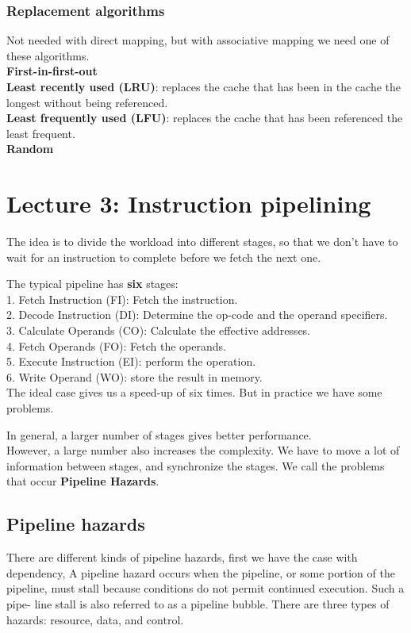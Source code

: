 \documentclass[titlepage, a4paper]{article}
\begin{document}
\subsubsection{Replacement algorithms}
Not needed with direct mapping, but with associative mapping we need one of these algorithms. \\

\textbf{First-in-first-out} \\
\textbf{Least recently used (LRU)}: replaces the cache that has been in the cache the longest without being referenced.\\
\textbf{Least frequently used (LFU)}: replaces the cache that has been referenced the least frequent.\\ 
\textbf{Random}\\ 

\section{Lecture 3: Instruction pipelining}
The idea is to divide the workload into different stages, so that we don't have to wait for an instruction to complete before we fetch the next one.

The typical pipeline has \textbf{six} stages: \\
1. Fetch Instruction (FI): Fetch the instruction.\\
2. Decode Instruction (DI): Determine the op-code and the operand specifiers.\\
3. Calculate Operands (CO): Calculate the effective addresses.\\
4. Fetch Operands (FO): Fetch the operands.\\
5. Execute Instruction (EI): perform the operation.\\
6. Write Operand (WO): store the result in memory.\\

The ideal case gives us a speed-up of six times. But in practice we have some problems.

In general, a larger number of stages gives better performance. \\
However, a large number also increases the complexity. We have to  move a lot of information between stages, and synchronize the stages. We call the problems that occur \textbf{Pipeline Hazards}.

\subsection{Pipeline hazards}
There are different kinds of pipeline hazards, first we have the case with dependency, A pipeline hazard occurs when the pipeline, or some portion of the pipeline, must stall because conditions do not permit continued execution. Such a pipe- line stall is also referred to as a pipeline bubble. There are three types of hazards: resource, data, and control. \\
\end{document}
